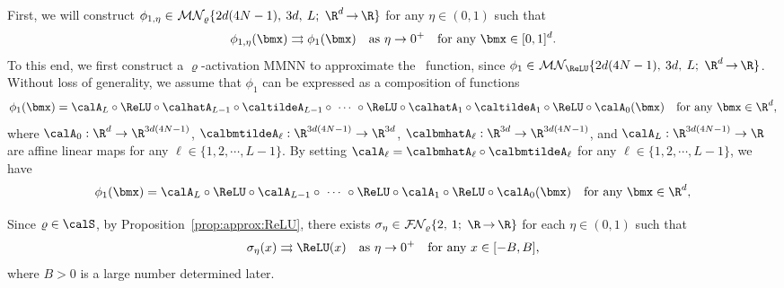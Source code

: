 \documentclass[11pt,a4paper]{article}
\begin{document}
First, we will construct 
$\phi_{1,\eta}\in \mn{\varrho}{2d(4N-1)}{3d}{L}{\R^d}{\R}$ for any $\eta\in(0,1)$ such that
\begin{equation*}
		\phi_{1,\eta}(\bmx)\rightrightarrows \phi_{1 }(\bmx)\quad \tn{as}\  \eta\to 0^+\quad \tn{for any $\bmx\in [0,1]^d$.}
	\end{equation*}
To this end, we first construct a $\varrho$-activation MMNN to approximate the \ReLU\ function, since $\phi_{1 }\in \mn{\ReLU}{2d(4N-1)}{3d}{L}{\R^d}{\R}$. 
Without loss of generality, we assume that $\phi_1$ can be expressed as a composition of functions
	\begin{equation*}
		\phi_1(\bmx) =\calA_L\circ\ReLU\circ
        \calhatA_{L-1}\circ\caltildeA_{L-1}\circ  \ \cdots \  \circ \ReLU\circ \calhatA_{ 1}\circ\caltildeA_{ 1}\circ \ReLU\circ\calA_0(\bmx)\quad \tn{for any $\bmx\in\R^d$},
	\end{equation*}
	where $\calA_0:\R^d\to \R^{3d(4N-1)}$, $\calbmtildeA_\ell:\R^{3d(4N-1)}\to\R^{3d}$, $\calbmhatA_\ell:\R^{3d}\to \R^{3d(4N-1)}$, and $\calA_L:\R^{3d(4N-1)}\to\R $ are affine linear maps for any $\ell\in \{1,2,\cdots,L-1\}$.
    By setting $\calA_\ell=\calbmhatA_\ell\circ\calbmtildeA_\ell$ for any $\ell\in \{1,2,\cdots,L-1\}$, we have
	\begin{equation*}
		\phi_1(\bmx) =\calA_L\circ\ReLU\circ\calA_{L-1}\circ  \ \cdots \  \circ \ReLU\circ\calA_1\circ\ReLU\circ\calA_0(\bmx)\quad \tn{for any $\bmx\in\R^d$},
	\end{equation*}

Since $\varrho\in\calS$, by Proposition~\ref{prop:approx:ReLU}, there exists 
$\sigma_\eta\in\nn{\varrho}{2}{1}{\R}{\R}$
for each $\eta\in(0,1)$
such that
\begin{equation*}
		\sigma_{ \eta}( x)\rightrightarrows \ReLU(x)\quad \tn{as}\  \eta\to 0^+\quad \tn{for any $ x\in [-B,B]$,}
	\end{equation*}
    where $B>0$ is a large number determined later.
\end{document}
